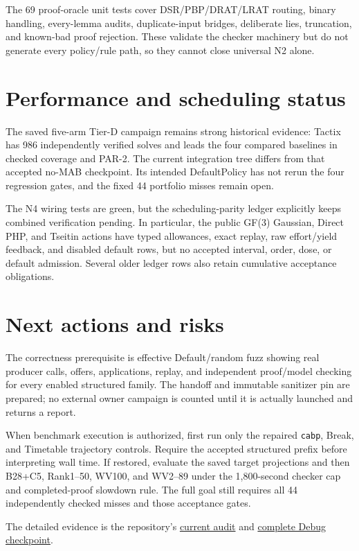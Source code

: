 \documentclass[11pt]{article}
\newcommand{\code}[1]{\texttt{#1}}
\begin{document}
The 69 proof-oracle unit tests cover DSR/PBP/DRAT/LRAT routing, binary handling,
every-lemma audits, duplicate-input bridges, deliberate lies, truncation, and
known-bad proof rejection.  These validate the checker machinery but do not
generate every policy/rule path, so they cannot close universal N2 alone.

\section*{Performance and scheduling status}

The saved five-arm Tier-D campaign remains strong historical evidence: Tactix
has 986 independently verified solves and leads the four compared baselines in
checked coverage and PAR-2.  The current integration tree differs from that
accepted no-MAB checkpoint.  Its intended DefaultPolicy has not rerun the four
regression gates, and the fixed 44 portfolio misses remain open.

The N4 wiring tests are green, but the scheduling-parity ledger explicitly
keeps combined verification pending.  In particular, the public GF(3)
Gaussian, Direct PHP, and Tseitin actions have typed allowances, exact replay,
raw effort/yield feedback, and disabled default rows, but no accepted interval,
order, dose, or default admission.  Several older ledger rows also retain
cumulative acceptance obligations.

\section*{Next actions and risks}

The correctness prerequisite is effective Default/random fuzz showing real
producer calls, offers, applications, replay, and independent proof/model
checking for every enabled structured family.  The handoff and immutable
sanitizer pin are prepared; no external owner campaign is counted until it is
actually launched and returns a report.

When benchmark execution is authorized, first run only the repaired
\code{cabp}, Break, and Timetable trajectory controls.  Require the accepted
structured prefix before interpreting wall time.  If restored, evaluate the
saved target projections and then B28+C5, Rank1--50, WV100, and WV2--89 under
the 1,800-second checker cap and completed-proof slowdown rule.  The full goal
still requires all 44 independently checked misses and those acceptance gates.

The detailed evidence is the repository's
\href{../../benchmarks/reports/2026-10-04-current-n1-n4-audit.md}{current audit}
and
\href{../../benchmarks/reports/2026-10-04-public-controller-full-debug.md}{complete Debug checkpoint}.
\end{document}
